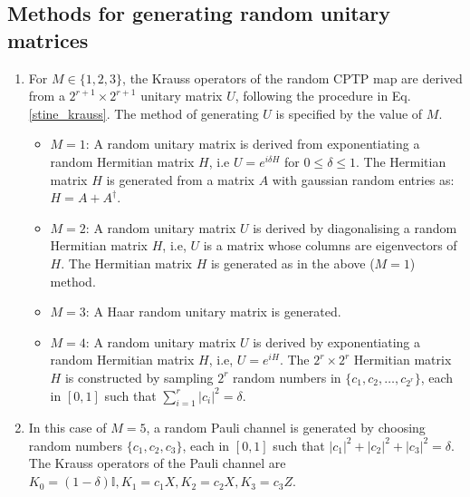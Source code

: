 \documentclass[11pt]{article}
\def\bI{\mathbb{I}}
\begin{document}
\subsection{Methods for generating random unitary matrices} \label{randu}
\begin{enumerate}
\item For $M \in \{1,2,3\}$, the Krauss operators of the random CPTP map are derived from a $2^{r+1}\times 2^{r+1}$ unitary matrix $U$, following the procedure in Eq. \ref{stine_krauss}. The method of generating $U$ is specified by the value of $M$.
\begin{itemize}
\item $M = 1$: A random unitary matrix is derived from exponentiating a random Hermitian matrix $H$, i.e $U = e^{i \delta H}$ for $0\leq\delta\leq 1$. The Hermitian matrix $H$ is generated from a matrix $A$ with gaussian random entries as: $H = A + A^{\dagger}$.
\item $M = 2$: A random unitary matrix $U$ is derived by diagonalising a random Hermitian matrix $H$, i.e, $U$ is a matrix whose columns are eigenvectors of $H$. The Hermitian matrix $H$ is generated as in the above ($M = 1$) method.
\item $M = 3$: A Haar random unitary matrix is generated.
\item $M = 4$: A random unitary matrix $U$ is derived by exponentiating a random Hermitian matrix $H$, i.e, $U = e^{i H}$. The $2^{r}\times 2^{r}$ Hermitian matrix $H$ is constructed by sampling $2^{r}$ random numbers in $\{c_{1}, c_{2}, \ldots, c_{2^{r}}\}$, each in $[0,1]$ such that $\sum_{i = 1}^{r}|c_{i}|^{2} = \delta$.
\end{itemize}
\item In this case of $M = 5$, a random Pauli channel is generated by choosing random numbers $\{c_{1}, c_{2}, c_{3}\}$, each in $[0,1]$ such that $|c_{1}|^{2} + |c_{2}|^{2} + |c_{3}|^{2} = \delta$. The Krauss operators of the Pauli channel are $K_{0} = (1 - \delta)\bI, K_{1} = c_{1}X, K_{2} = c_{2}X, K_{3} = c_{3}Z$.
\end{enumerate}
\end{document}
